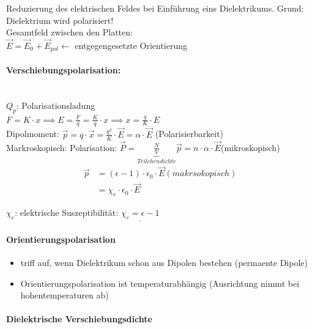 \documentclass[11pt]{article}
\begin{document}
Reduzierung des elektrischen Feldes bei Einführung eins Dielektrikums. Grund: Dielektrium wird polarisiert!\\

Gesamtfeld zwischen den Platten:\\
$\vec{E}=\vec{E}_0+\vec{E}_{pol} \leftarrow$ entgegengesetzte Orientierung\\


\paragraph{Verschiebungspolarisation:}
\hfill \\
$ Q_p $: Polarisationsladung\\
$F=K\cdot x \implies E=\frac{F}{q}=\frac{K}{q}\cdot x \implies x=\frac{q}{K}\cdot E$\\

Dipolmoment: $\vec{p}=q\cdot\vec{x}=\frac{q^2}{K}\cdot\vec{E}=\alpha\cdot\vec{E}$ (Polarisierbarkeit)\\

Markroskopisch: Polarisation: $\vec{P}=\underbrace{\frac{N}{V}}_{Teilchendichte}\vec{p}=n\cdot\alpha\cdot\vec{E}$(mikroskopisch)\\

\begin{align*}
	\vec{p}&=(\epsilon-1)\cdot\epsilon_0\cdot\vec{E} (makrsokopisch)\\
	&=\chi_e\cdot\epsilon_0\cdot\vec{E}
\end{align*}

$ \chi_e $: elektrische Suszeptibilität: $\underline{\chi_e=\epsilon-1}$\\

\paragraph{Orientierungspolarisation}

\begin{itemize}
	\item triff auf, wenn Dielektrikum schon aus Dipolen bestehen (permaente Dipole)
	\item Orientierungspolarisation ist temperaturabhängig (Ausrichtung nimmt bei hohentemperaturen ab)
\end{itemize}

\paragraph{Dielektrische Verschiebungsdichte}
\end{document}
